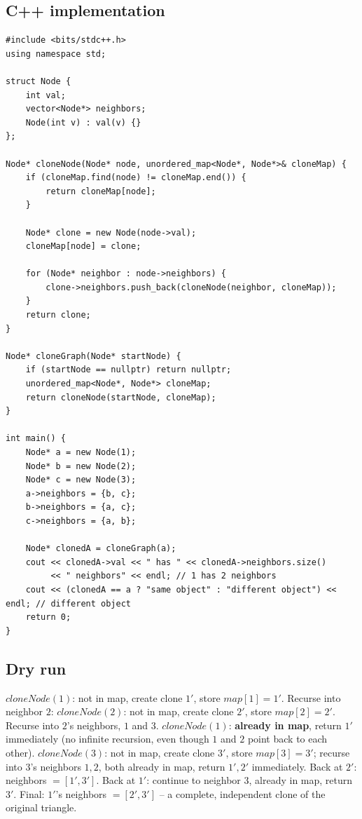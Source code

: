 \subsection*{C++ implementation}

\begin{lstlisting}
#include <bits/stdc++.h>
using namespace std;

struct Node {
    int val;
    vector<Node*> neighbors;
    Node(int v) : val(v) {}
};

Node* cloneNode(Node* node, unordered_map<Node*, Node*>& cloneMap) {
    if (cloneMap.find(node) != cloneMap.end()) {
        return cloneMap[node];
    }

    Node* clone = new Node(node->val);
    cloneMap[node] = clone;

    for (Node* neighbor : node->neighbors) {
        clone->neighbors.push_back(cloneNode(neighbor, cloneMap));
    }
    return clone;
}

Node* cloneGraph(Node* startNode) {
    if (startNode == nullptr) return nullptr;
    unordered_map<Node*, Node*> cloneMap;
    return cloneNode(startNode, cloneMap);
}

int main() {
    Node* a = new Node(1);
    Node* b = new Node(2);
    Node* c = new Node(3);
    a->neighbors = {b, c};
    b->neighbors = {a, c};
    c->neighbors = {a, b};

    Node* clonedA = cloneGraph(a);
    cout << clonedA->val << " has " << clonedA->neighbors.size()
         << " neighbors" << endl; // 1 has 2 neighbors
    cout << (clonedA == a ? "same object" : "different object") << endl; // different object
    return 0;
}
\end{lstlisting}

\subsection*{Dry run}


$\textit{cloneNode}(1)$: not in map, create clone $1'$, store
$\textit{map}[1]=1'$. Recurse into neighbor $2$:
$\textit{cloneNode}(2)$: not in map, create clone $2'$, store
$\textit{map}[2]=2'$. Recurse into $2$'s neighbors, $1$ and $3$.
$\textit{cloneNode}(1)$: \textbf{already in map}, return $1'$
immediately (no infinite recursion, even though $1$ and $2$ point back
to each other). $\textit{cloneNode}(3)$: not in map, create clone
$3'$, store $\textit{map}[3]=3'$; recurse into $3$'s neighbors $1,2$,
both already in map, return $1',2'$ immediately. Back at $2'$:
neighbors $=[1',3']$. Back at $1'$: continue to neighbor $3$, already
in map, return $3'$. Final: $1'$'s neighbors $=[2',3']$ -- a complete,
independent clone of the original triangle.

